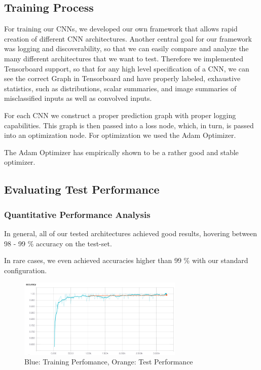 \documentclass{article}
\begin{document}
\subsection{Training Process}

For training our CNNs, we developed our own framework that allows rapid creation of different CNN architectures. Another central goal for our framework was logging and discoverability, so that we can easily compare and analyze the many different architectures that we want to test. Therefore we implemented Tensorboard support, so that for any high level specification of a CNN, we can see the correct Graph in Tensorboard and have properly labeled, exhaustive statistics, such as distributions, scalar summaries, and image summaries of misclassified inputs as well as convolved inputs.

For each CNN we construct a proper prediction graph with proper logging capabilities. This graph is then passed into a loss node, which, in turn, is passed into an optimization node. For optimization we used the Adam Optimizer.

The Adam Optimizer has empirically shown to be a rather good and stable optimizer. 

\subsection{Evaluating Test Performance}
\subsubsection{Quantitative Performance Analysis}

In general, all of our tested architectures achieved good results, hovering between 98 - 99 \% accuracy on the test-set.

In rare cases, we even achieved accuracies higher than 99 \% with our standard configuration.

\begin{figure}[h]
\centering
\includegraphics[width=0.7\textwidth]{imgs/accuracy_std.png}
\caption{Blue: Training Perfomance, Orange: Test Performance}
\end{figure}
\end{document}
